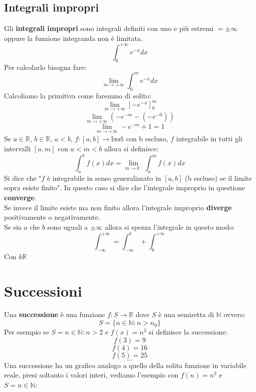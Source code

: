 \documentclass[12pt,a4paper]{article}
\let\oldsection\section
\renewcommand{\section}{\clearpage\oldsection}
\begin{document}
\subsection{Integrali impropri}
Gli \textbf{integrali impropri} sono integrali definiti con uno e più estremi $= \pm \infty$ oppure la funzione integranda non è limitata.
\[
\int_0^{+\infty} e^{-x} dx
\]
Per calcolarlo bisogna fare:
\[
\lim_{m \to +\infty} \int_0^{m} e^{-x} dx
\]
Calcoliamo la primitiva come faremmo di solito:
\[
\lim_{m \to +\infty} [-e^{-x}]_0^m
\]
\[
\lim_{m \to +\infty} (-e^{-m} - (-e^{-0}))
\]
\[
\lim_{m \to +\infty} -e^{-m} + 1 = 1
\]
Se $a \in \mathbb{R}$, $b \in \mathbb{\overline{R}}$, $a<b$, $f:[a,b] \to \mathbb{text}$ con b escluso, $f$ integrabile in tutti gli intervalli
$[a,m]$ con $a<m<b$ allora si definisce:
\[
\int_{a}^{b} f(x) dx = \lim_{m \to b^-} \int_{a}^{m} f(x) dx
\]
Si dice che "$f$ è integrabile in senso generalizzato in $[a,b]$ (b escluso) se il limite sopra esiste finito". In questo caso si dice che l'integrale improprio in questione \textbf{converge}.\\
Se invece il limite esiste ma non finito allora l'integrale improprio \textbf{diverge} positivamente o negativamente.\\
Se sia $a$ che $b$ sono uguali a $\pm \infty$ allora si spezza l'integrale in questo modo:
\[
\int_{-\infty}^{+\infty} = \int_{-\infty}^{k} + \int_{k}^{+\infty}
\]
Con $k \mathbb{R}$

\section{Successioni}
Una \textbf{successione} è una funzione $f:S \to \mathbb{R}$ dove $S$ è una semiretta di $\mathbb{N}$ ovvero:
\[
S = \{n \in \mathbb{N} : n > n_0\}
\]
Per esempio se $S = {n \in \mathbb{N} : n > 2}$ e $f(x) = n^2$ si definisce la successione:
\[
f(3) = 9
\]
\[
f(4) = 16
\]
\[
f(5) = 25
\]
\[
...
\]
Una successione ha un grafico analogo a quello della solita funzione in variabile reale, presi soltanto i valori interi, vediamo l'esempio con $f(n) = n^2$ e $S = {n \in \mathbb{N}}$:
\begin{center}
\end{center}
\end{document}
